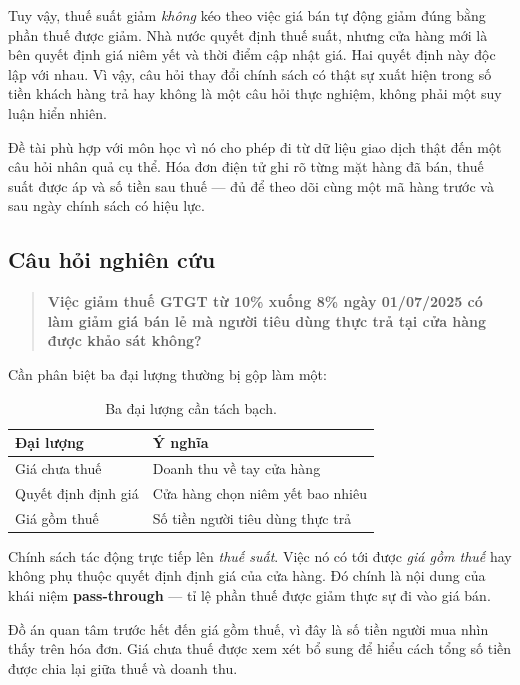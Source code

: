 \documentclass[11pt]{article}
\begin{document}
Tuy vậy, thuế suất giảm \emph{không} kéo theo việc giá bán tự động giảm đúng bằng phần thuế được
giảm. Nhà nước quyết định thuế suất, nhưng cửa hàng mới là bên quyết định giá niêm yết và thời
điểm cập nhật giá. Hai quyết định này độc lập với nhau. Vì vậy, câu hỏi thay đổi chính sách có
thật sự xuất hiện trong số tiền khách hàng trả hay không là một câu hỏi thực nghiệm, không phải
một suy luận hiển nhiên.

Đề tài phù hợp với môn học vì nó cho phép đi từ dữ liệu giao dịch thật đến một câu hỏi nhân quả
cụ thể. Hóa đơn điện tử ghi rõ từng mặt hàng đã bán, thuế suất được áp và số tiền sau thuế --- đủ
để theo dõi cùng một mã hàng trước và sau ngày chính sách có hiệu lực.

\subsection{Câu hỏi nghiên cứu}

\begin{quote}
\textbf{Việc giảm thuế GTGT từ 10\% xuống 8\% ngày 01/07/2025 có làm giảm giá bán lẻ mà người tiêu
dùng thực trả tại cửa hàng được khảo sát không?}
\end{quote}

Cần phân biệt ba đại lượng thường bị gộp làm một:

\begin{table}[htbp]
  \centering
  \caption{Ba đại lượng cần tách bạch.}
  \label{tab:ba-dai-luong}
  \begin{tabular}{ll}
    \toprule
    Đại lượng & Ý nghĩa \\
    \midrule
    Giá chưa thuế         & Doanh thu về tay cửa hàng \\
    Quyết định định giá   & Cửa hàng chọn niêm yết bao nhiêu \\
    Giá gồm thuế          & Số tiền người tiêu dùng thực trả \\
    \bottomrule
  \end{tabular}
\end{table}

Chính sách tác động trực tiếp lên \emph{thuế suất}. Việc nó có tới được \emph{giá gồm thuế} hay
không phụ thuộc quyết định định giá của cửa hàng. Đó chính là nội dung của khái niệm
\textbf{pass-through} --- tỉ lệ phần thuế được giảm thực sự đi vào giá bán.

Đồ án quan tâm trước hết đến giá gồm thuế, vì đây là số tiền người mua nhìn thấy trên hóa đơn.
Giá chưa thuế được xem xét bổ sung để hiểu cách tổng số tiền được chia lại giữa thuế và doanh thu.
\end{document}
